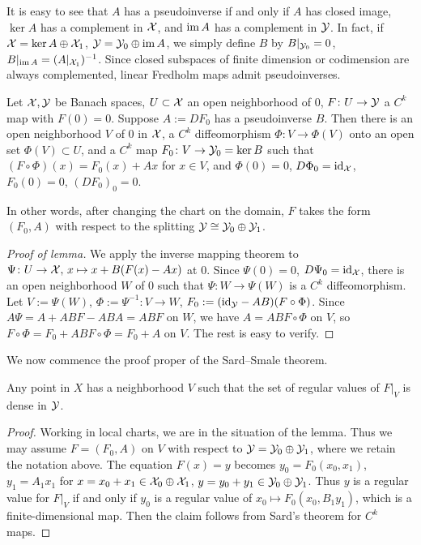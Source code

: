It is easy to see that $A$ has a pseudoinverse if and only if 
$A$ has closed image, $\ker A$ has a complement in ${\mathcal{X}}$, and 
$\operatorname{im} A$ has a complement in ${\mathcal{Y}}$. 
In fact, if 
${\mathcal{X}} = \ker A \oplus {\mathcal{X}}_1$, 
${\mathcal{Y}} = {\mathcal{Y}}_0 \oplus \operatorname{im} A$, 
we simply define $B$ by 
$B |_{{\mathcal{Y}}_0} = 0$, 
$B |_{\operatorname{im} A} = (A |_{{\mathcal{X}}_1})^{-1}$. 
Since closed subspaces of finite dimension or codimension are 
always complemented, linear Fredholm maps admit pseudoinverses.

\begin{lemma}
	Let ${\mathcal{X}}, {\mathcal{Y}}$ be Banach spaces, 
	$U \subset {\mathcal{X}}$ an open neighborhood of $0$, 
	$F \colon U \to {\mathcal{Y}}$ a $C^k$ map with $F(0) = 0$. 
	Suppose $A := DF_0$ has a pseudoinverse $B$. 
	Then there is an open neighborhood $V$ of $0$ in ${\mathcal{X}}$, 
	a $C^k$ diffeomorphism $\Phi \colon V \to \Phi(V)$ 
	onto an open set $\Phi(V) \subset U$, 
	and a $C^k$ map $F_0 \colon V \to {\mathcal{Y}}_0 = \ker B$ 
	such that $( F \circ \Phi ) (x) = F_0 (x) + Ax$ for $x \in V$, 
	and $\Phi(0) = 0$, $D\Phi_0 = {\mathrm{id}}_{\mathcal{X}}$, $F_0(0) = 0$, $(DF_0)_0 = 0$.
\end{lemma}

In other words, after changing the chart on the domain, 
$F$ takes the form $(F_0, A)$ with respect to the splitting 
${\mathcal{Y}} \cong {\mathcal{Y}}_0 \oplus {\mathcal{Y}}_1$.

\begin{proof}[Proof of lemma]
	We apply the inverse mapping theorem to 
	$\Psi \colon U \to {\mathcal{X}},\, x \mapsto x + B ( F(x) - Ax )$ at $0$. 
	Since $\Psi(0) = 0$, $D\Psi_0 = {\mathrm{id}}_{\mathcal{X}}$, there is 
	an open neighborhood $W$ of $0$ such that 
	$\Psi \colon W \to \Psi(W)$ is a $C^k$ diffeomorphism. 
	Let $V := \Psi(W)$, $\Phi := \Psi^{-1} \colon V\to W$, 
	$F_0 := ( {\mathrm{id}}_{{\mathcal{Y}}} - AB ) ( F \circ \Phi )$. 
	Since $A\Psi = A + ABF - ABA = ABF$ on $W$, 
	we have $A = ABF \circ \Phi$ on $V$, so 
	$F \circ \Phi = F_0 + ABF \circ \Phi = F_0 + A$ on $V$. 
	The rest is easy to verify.
\end{proof}

We now commence the proof proper of the Sard--Smale theorem.

\begin{step}{1}
	Any point in $X$ has a neighborhood $V$ such that 
	the set of regular values of $F |_V$ is dense in ${\mathcal{Y}}$.
\end{step}
\begin{proof}
	Working in local charts, we are in the situation of the lemma. 
	Thus we may assume $F = (F_0, A)$ on $V$ with respect to 
	${\mathcal{Y}} = {\mathcal{Y}}_0 \oplus {\mathcal{Y}}_1$, where we retain the notation above. 
	The equation $F(x) = y$ becomes $y_0 = F_0 (x_0, x_1)$, 
	$y_1 = A_1 x_1$ for $x = x_0 + x_1 \in {\mathcal{X}}_0 \oplus {\mathcal{X}}_1$, 
	$y = y_0 + y_1 \in {\mathcal{Y}}_0 \oplus {\mathcal{Y}}_1$. 
	Thus $y$ is a regular value for $F |_V$ if and only if 
	$y_0$ is a regular value of $x_0 \mapsto F_0 (x_0, B_1 y_1)$, 
	which is a finite-dimensional map. 
	Then the claim follows from Sard's theorem for $C^k$ maps.
\end{proof}

